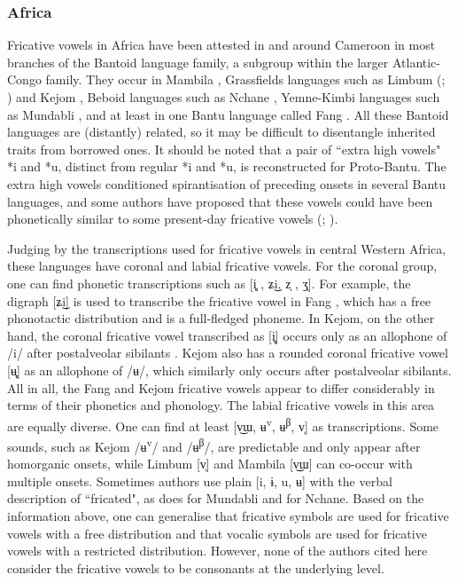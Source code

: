\documentclass[output=paper,colorlinks,citecolor=brown,chinesefont]{langscibook}
\begin{document}
\subsubsection{Africa}
Fricative vowels in Africa have been attested in and around Cameroon in most branches of the Bantoid language family, a subgroup within the larger Atlantic-Congo family. They occur in Mambila \citep{connell_2007}, Grassfields languages such as Limbum (\cite{Fransen_1995}; \cite{Faytak_2017}) and Kejom \citep{Faytak&Akumbu_2021}, Beboid languages such as Nchane \citep{boutwell_2020}, Yemne-Kimbi languages such as Mundabli \citep{Voll_2017}, and at least in one Bantu language called Fang \citep{Kelly_1974}. All these Bantoid languages are (distantly) related, so it may be difficult to disentangle inherited traits from borrowed ones. It should be noted that a pair of ``extra high vowels" *i and *u, distinct from regular *i and *u, is reconstructed for Proto-Bantu. The extra high vowels conditioned spirantisation of preceding onsets in several Bantu languages, and some authors have proposed that these vowels could have been phonetically similar to some present-day fricative vowels (\cite{connell_2007}; \cite{Faytak_and_Merrill_2014}).

Judging by the transcriptions used for fricative vowels in central Western Africa, these languages have coronal and labial fricative vowels. For the coronal group, one can find phonetic transcriptions such as [i̻ , ʑ͜i, z̩ , ʒ̩]. For example, the digraph [ʑ͜i] is used to transcribe the fricative vowel in Fang \citep{Kelly_1974}, which has a free phonotactic distribution and is a full-fledged phoneme. In Kejom, on the other hand, the coronal fricative vowel transcribed as [i̻] occurs only as an allophone of /i/ after postalveolar sibilants \citep{Faytak&Akumbu_2021}. Kejom also has a rounded coronal fricative vowel [ʉ̻] as an allophone of /ʉ/, which similarly only occurs after postalveolar sibilants. All in all, the Fang and Kejom fricative vowels appear to differ considerably in terms of their phonetics and phonology. The labial fricative vowels in this area are equally diverse. One can find at least [v͜ɯ, ʉ\textsuperscript{v}, ʉ\textsuperscript{β}, v̩] as transcriptions. Some sounds, such as Kejom /ʉ\textsuperscript{v}/ and /ʉ\textsuperscript{β}/, are predictable and only appear after homorganic onsets, while Limbum [v̩] and Mambila [v͜ɯ] can co-occur with multiple onsets. Sometimes authors use plain [i, ɨ, u, ʉ] with the verbal description of ``fricated", as \citet{Voll_2017} does for Mundabli and \citet{boutwell_2020} for Nchane. Based on the information above, one can generalise that fricative symbols are used for fricative vowels with a free distribution and that vocalic symbols are used for fricative vowels with a restricted distribution. However, none of the authors cited here consider the fricative vowels to be consonants at the underlying level.
\end{document}
